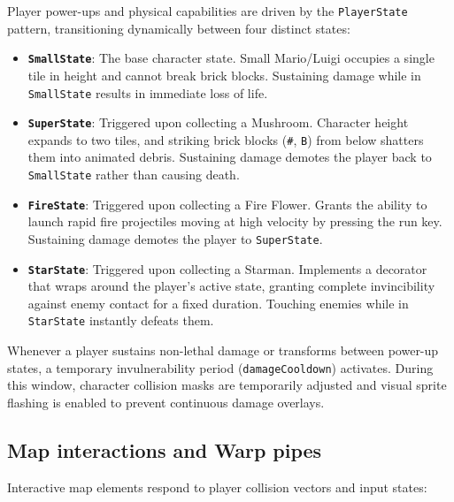 \documentclass[12pt, a4paper]{article}
\begin{document}
Player power-ups and physical capabilities are driven by the \texttt{PlayerState} pattern, transitioning dynamically between four distinct states:

\begin{itemize}
\item \textbf{\texttt{SmallState}}: The base character state. Small Mario/Luigi occupies a single tile in height and cannot break brick blocks. Sustaining damage while in \texttt{SmallState} results in immediate loss of life.
\item \textbf{\texttt{SuperState}}: Triggered upon collecting a Mushroom. Character height expands to two tiles, and striking brick blocks (\texttt{\#}, \texttt{B}) from below shatters them into animated debris. Sustaining damage demotes the player back to \texttt{SmallState} rather than causing death.
\item \textbf{\texttt{FireState}}: Triggered upon collecting a Fire Flower. Grants the ability to launch rapid fire projectiles moving at high velocity by pressing the run key. Sustaining damage demotes the player to \texttt{SuperState}.
\item \textbf{\texttt{StarState}}: Triggered upon collecting a Starman. Implements a decorator that wraps around the player's active state, granting complete invincibility against enemy contact for a fixed duration. Touching enemies while in \texttt{StarState} instantly defeats them.
\end{itemize}

Whenever a player sustains non-lethal damage or transforms between power-up states, a temporary invulnerability period (\texttt{damageCooldown}) activates. During this window, character collision masks are temporarily adjusted and visual sprite flashing is enabled to prevent continuous damage overlays.

\newpage

\subsection{Map interactions and Warp pipes}

Interactive map elements respond to player collision vectors and input states:
\end{document}
